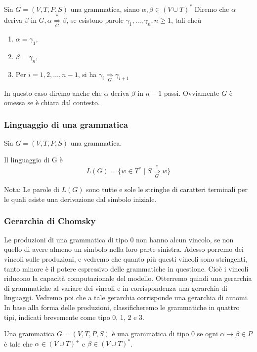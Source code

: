\vspace{5mm}

Sia $G=(V, T, P, S)$ una grammatica, siano $\alpha, \beta \in(V \cup T)^{*}$ Diremo che $\alpha$ deriva $\beta$ in $G, \alpha \underset{G}{\stackrel{*}{\Rightarrow}} \beta$, se esistono parole $\gamma_{1}, \ldots, \gamma_{n}, n \geq 1$, tali cheù
\begin{enumerate}
    \item $\alpha=\gamma_{1}$,
    \item $\beta=\gamma_{n}$,
    \item Per $i=1,2, \ldots, n-1$, si ha $\gamma_{i} \underset{G}{\stackrel{}{\Rightarrow}} \gamma_{i+1}$
\end{enumerate}
In questo caso diremo anche che $\alpha$ deriva $\beta$ in $n-1$ passi. Ovviamente $G$ è omessa se è chiara dal contesto.

\subsubsection{Linguaggio di una grammatica}
Sia $G=(V, T, P, S)$ una grammatica.

Il linguaggio di G è
$$
L(G)=\{w \in T^{*} \mid S \underset{G}{\stackrel{*}{\Rightarrow}} w\}
$$

Nota: Le parole di $L(G)$ sono tutte e sole le stringhe di caratteri terminali per le quali esiste una derivazione dal simbolo iniziale.

\subsubsection{Gerarchia di Chomsky}
Le produzioni di una grammatica di tipo 0 non hanno alcun vincolo, se non quello di avere almeno un simbolo nella loro parte sinistra.
Adesso porremo dei vincoli sulle produzioni, e vedremo che quanto più questi vincoli sono stringenti, tanto minore è il potere espressivo delle grammatiche in questione.
Cioè i vincoli riducono la capacità computazionale del modello.
Otterremo quindi una gerarchia di grammatiche al variare dei vincoli e in corrispondenza una gerarchia di linguaggi.
Vedremo poi che a tale gerarchia corrisponde una gerarchia di automi.
In base alla forma delle produzioni, classiﬁcheremo le grammatiche in quattro tipi, indicati brevemente come tipo 0, 1, 2 e 3.

\vspace{5mm}

Una grammatica $G=(V, T, P, S)$ è una grammatica di tipo 0 se ogni $\alpha \rightarrow \beta \in P$ è tale che $\alpha \in(V \cup T)^{+}$ e $ \beta \in(V \cup T)^{*}$.

